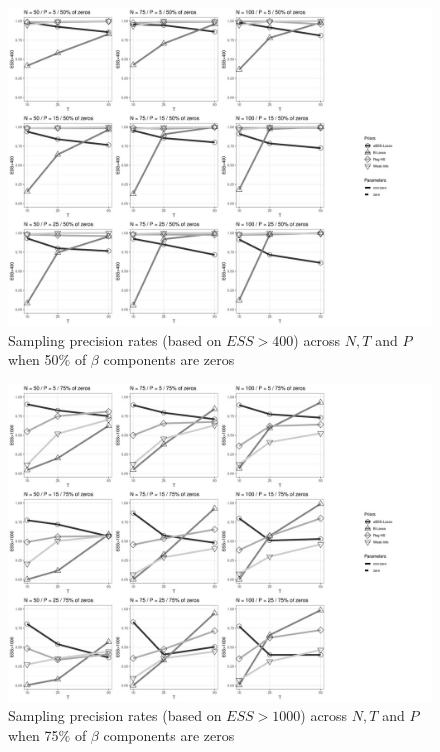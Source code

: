 \documentclass[a4paper,12pt]{article}
\begin{document}
\begin{figure}[]
\centering 
\includegraphics[width=18cm]{Prec400_nz50_beta.jpg}
\caption{Sampling precision rates (based on $ESS>400$) across $N, T$ and $P$ when 50\% of $\beta$ components are zeros}
\label{fig:Prec400_nz50}
\end{figure}

\clearpage
\begin{figure}[]
\centering 
\includegraphics[width=18cm]{Prec1000_nz25_beta.jpg}
\caption{Sampling precision rates (based on $ESS>1000$) across $N, T$ and $P$ when 75\% of $\beta$ components are zeros}
\label{fig:Prec1000_nz25}
\end{figure}
\end{document}
